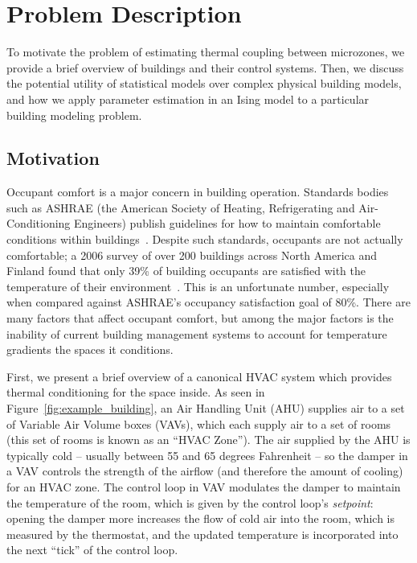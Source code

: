 \section{Problem Description}

To motivate the problem of estimating thermal coupling between microzones, we provide a brief overview of buildings and their control systems.
Then, we discuss the potential utility of statistical models over complex physical building models, and how we apply parameter estimation in an Ising model to a particular building modeling problem.

\subsection{Motivation}


Occupant comfort is a major concern in building operation.
Standards bodies such as ASHRAE (the American Society of Heating, Refrigerating and Air-Conditioning Engineers) publish guidelines for how to maintain comfortable conditions within buildings~\cite{givoni1992comfort}.
Despite such standards, occupants are not actually comfortable; a 2006 survey of over 200 buildings across North America and Finland found that only 39\% of building occupants are satisfied with the temperature of their environment~\cite{huizenga2006air}.
This is an unfortunate number, especially when compared against ASHRAE's occupancy satisfaction goal of 80\%.
There are many factors that affect occupant comfort, but among the major factors is the inability of current building management systems to account for temperature gradients the spaces it conditions.

First, we present a brief overview of a canonical HVAC system which provides thermal conditioning for the space inside.
As seen in Figure~\ref{fig:example_building}, an Air Handling Unit (AHU) supplies air to a set of Variable Air Volume boxes (VAVs), which each supply air to a set of rooms (this set of rooms is known as an ``HVAC Zone'').
The air supplied by the AHU is typically cold -- usually between 55 and 65 degrees Fahrenheit -- so the damper in a VAV controls the strength of the airflow (and therefore the amount of cooling) for an HVAC zone.
The control loop in VAV modulates the damper to maintain the temperature of the room, which is given by the control loop's \emph{setpoint}: opening the damper more increases the flow of cold air into the room, which is measured by the thermostat, and the updated temperature is incorporated into the next ``tick'' of the control loop.

